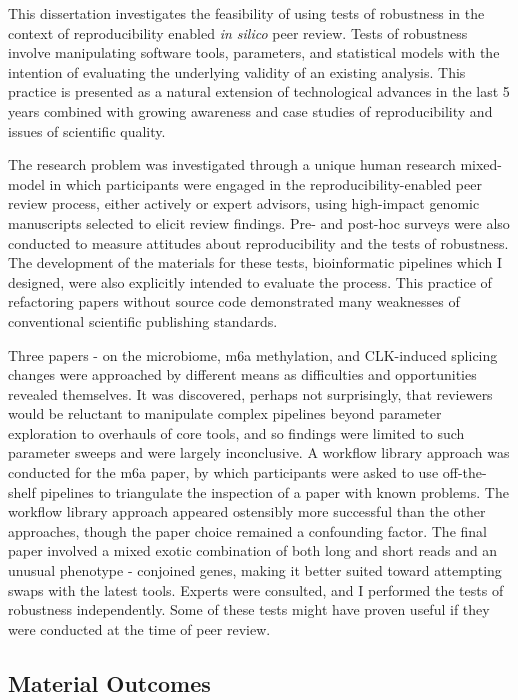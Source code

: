 \documentclass{drexelthesis}
\begin{document}
This dissertation investigates the feasibility of using tests of robustness in the context of reproducibility enabled \textit{in silico} peer review. Tests of robustness involve manipulating software tools, parameters, and statistical models with the intention of evaluating the underlying validity of an existing analysis. This practice is presented as a natural extension of technological advances in the last 5 years combined with growing awareness and case studies of reproducibility and issues of scientific quality.

The research problem was investigated through a unique human research mixed-model in which participants were engaged in the reproducibility-enabled peer review process, either actively or expert advisors, using high-impact genomic manuscripts selected to elicit review findings. Pre- and post-hoc surveys were also conducted to measure attitudes about reproducibility and the tests of robustness. The development of the materials for these tests, bioinformatic pipelines which I designed, were also explicitly intended to evaluate the process. This practice of refactoring papers without source code demonstrated many weaknesses of conventional scientific publishing standards.

Three papers - on the microbiome, m6a methylation, and CLK-induced splicing changes were approached by different means as difficulties and opportunities revealed themselves. It was discovered, perhaps not surprisingly, that reviewers would be reluctant to manipulate complex pipelines beyond parameter exploration to overhauls of core tools, and so findings were limited to such parameter sweeps and were largely inconclusive. A workflow library approach was conducted for the m6a paper, by which participants were asked to use off-the-shelf pipelines to triangulate the inspection of a paper with known problems. The workflow library approach appeared ostensibly more successful than the other approaches, though the paper choice remained a confounding factor. The final paper involved a mixed exotic combination of both long and short reads and an unusual phenotype - conjoined genes, making it better suited toward attempting swaps with the latest tools. Experts were consulted, and I performed the tests of robustness independently. Some of these tests might have proven useful if they were conducted at the time of peer review.

\subsection{Material Outcomes}
\end{document}
